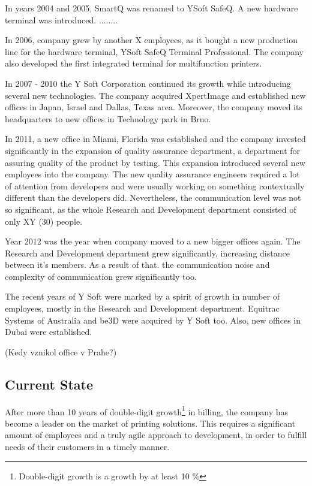 \documentclass[11pt,singleside]{myfithesis2}
\begin{document}
In years 2004 and 2005, SmartQ was renamed to YSoft SafeQ. A new hardware terminal was introduced. ........

In 2006, company grew by another X employees, as it bought a new production line for the hardware terminal, YSoft SafeQ Terminal Professional. The company also developed the first integrated terminal for multifunction printers.

In 2007 - 2010 the Y Soft Corporation continued its growth while introducing several new technologies. The company acquired XpertImage and established new offices in Japan, Israel and Dallas, Texas area. Moreover, the company moved its headquarters to new offices in Technology park in Brno.

In 2011, a new office in Miami, Florida was established and the company invested significantly in the expansion of quality assurance department, a department for assuring quality of the product by testing. This expansion introduced several new employees into the company. The new quality assurance engineers required a lot of attention from developers and were usually working on something contextually different than the developers did. Nevertheless, the communication level was not so significant, as the whole Research and Development department consisted of only XY (30) people.

Year 2012 was the year when company moved to a new bigger offices again. The Research and Development department grew significantly, increasing distance between it's members. As a result of that. the communication noise and complexity of communication grew significantly too.

The recent years of Y Soft were marked by a spirit of growth in number of employees, mostly in the Research and Development department. Equitrac Systems of Australia and be3D were acquired by Y Soft too. Also, new offices in Dubai were established.

(Kedy vznikol office v Prahe?)


		\subsection{Current State}\label{currentState}
After more than 10 years of double-digit growth\footnote{Double-digit growth is a growth by at least 10 \%} in billing, the company has become a leader on the market of printing solutions. This requires a significant amount of employees and a truly agile approach to development, in order to fulfill needs of their customers in a timely manner. 
\end{document}
